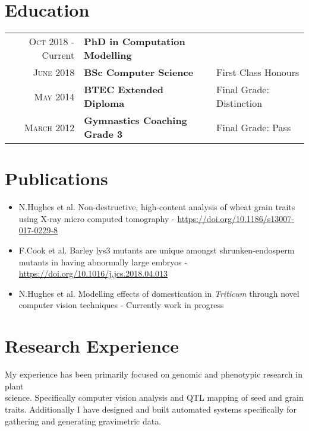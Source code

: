 \documentclass[a4paper,10pt]{article}
\begin{document}
\section{Education}
\begin{tabular}{rll}

  \textsc{Oct} 2018 - Current & \textbf{PhD in Computation Modelling} &   \\

  \textsc{June} 2018  & \textbf{BSc Computer Science} & First Class Honours \\

  \textsc{May} 2014& \textbf{BTEC Extended Diploma} & Final Grade: Distinction
  \\
  \textsc{March} 2012& \textbf{Gymnastics Coaching Grade 3} & Final Grade: Pass

\end{tabular}


\section{Publications}

  \begin{itemize}

    \item N.Hughes et al. Non-destructive, high-content analysis of wheat grain traits using X-ray micro computed tomography - \href{https://doi.org/10.1186/s13007-017-0229-8}{https://doi.org/10.1186/s13007-017-0229-8}

    \item F.Cook et al. Barley lys3 mutants are unique amongst shrunken-endosperm mutants in having abnormally large embryos - \href{https://doi.org/10.1016/j.jcs.2018.04.013}{https://doi.org/10.1016/j.jcs.2018.04.013}

    \item N.Hughes et al. Modelling effects of domestication in \textit{Triticum} through novel computer vision techniques - Currently work in progress

  \end{itemize}

\section{Research Experience}
My experience has been primarily focused on genomic and phenotypic research in plant \\science. Specifically computer vision analysis and QTL mapping of seed and grain traits. Additionally I have designed and built automated systems specifically for gathering and generating gravimetric data.
\end{document}
